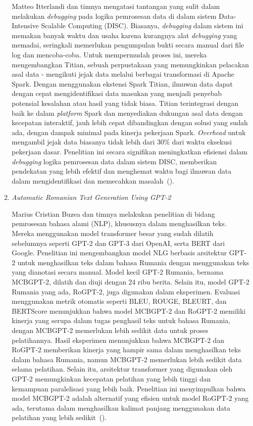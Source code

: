 \begin{enumerate}
Matteo Itterlandi dan timnya mengatasi tantangan yang sulit dalam melakukan \emph{debugging} pada logika pemrosesan data di dalam sistem Data-Intensive Scalable Computing (DISC). Biasanya, \emph{debugging} dalam sistem ini memakan banyak waktu dan usaha karena kurangnya alat \emph{debugging} yang memadai, seringkali memerlukan pengumpulan bukti secara manual dari file log dan mencoba-coba. Untuk mempermudah proses ini, mereka mengembangkan Titian, sebuah perpustakaan yang memungkinkan pelacakan asal data - mengikuti jejak data melalui berbagai transformasi di Apache Spark. Dengan menggunakan ekstensi Spark Titian, ilmuwan data dapat dengan cepat mengidentifikasi data masukan yang menjadi penyebab potensial kesalahan atau hasil yang tidak biasa. Titian terintegrasi dengan baik ke dalam \emph{platform} Spark dan menyediakan dukungan asal data dengan kecepatan interaktif, jauh lebih cepat dibandingkan dengan solusi yang sudah ada, dengan dampak minimal pada kinerja pekerjaan Spark. \emph{Overhead} untuk mengambil jejak data biasanya tidak lebih dari 30\% dari waktu eksekusi pekerjaan dasar. Penelitian ini secara signifikan meningkatkan efisiensi dalam \emph{debugging} logika pemrosesan data dalam sistem DISC, memberikan pendekatan yang lebih efektif dan menghemat waktu bagi ilmuwan data dalam mengidentifikasi dan memecahkan masalah~(\cite{interlandi2015}).

\item \emph{Automatic Romanian Text Generation Using GPT-2}

Marius Cristian Buzea dan timnya melakukan penelitian di bidang pemrosesan bahasa alami (NLP), khususnya dalam menghasilkan teks. Mereka menggunakan model transformer besar yang sudah dilatih sebelumnya seperti GPT-2 dan GPT-3 dari OpenAI, serta BERT dari Google. Penelitian ini mengembangkan model NLG berbasis arsitektur GPT-2 untuk menghasilkan teks dalam bahasa Rumania dengan menggunakan teks yang dianotasi secara manual. Model kecil GPT-2 Rumania, bernama MCBGPT-2, dilatih dan diuji dengan 24 ribu berita. Selain itu, model GPT-2 Rumania yang ada, RoGPT-2, juga digunakan dalam eksperimen. Evaluasi menggunakan metrik otomatis seperti BLEU, ROUGE, BLEURT, dan BERTScore menunjukkan bahwa model MCBGPT-2 dan RoGPT-2 memiliki kinerja yang serupa dalam tugas penghasil teks untuk bahasa Rumania, dengan MCBGPT-2 memerlukan lebih sedikit data untuk proses pelatihannya. Hasil eksperimen menunjukkan bahwa MCBGPT-2 dan RoGPT-2 memberikan kinerja yang hampir sama dalam menghasilkan teks dalam bahasa Rumania, namun MCBGPT-2 memerlukan lebih sedikit data selama pelatihan. Selain itu, arsitektur transformer yang digunakan oleh GPT-2 memungkinkan kecepatan pelatihan yang lebih tinggi dan kemampuan paralelisasi yang lebih baik. Penelitian ini menyimpulkan bahwa model MCBGPT-2 adalah alternatif yang efisien untuk model RoGPT-2 yang ada, terutama dalam menghasilkan kalimat panjang menggunakan data pelatihan yang lebih sedikit~(\cite{buzea2022}).


\end{enumerate}


